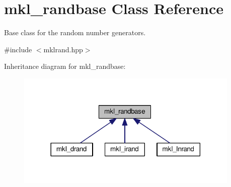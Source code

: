 \hypertarget{classmkl__randbase}{}\section{mkl\+\_\+randbase Class Reference}
\label{classmkl__randbase}


Base class for the random number generators.  




{\ttfamily \#include $<$mklrand.\+hpp$>$}



Inheritance diagram for mkl\+\_\+randbase\+:
\nopagebreak
\begin{figure}[H]
\begin{center}
\leavevmode
\includegraphics[width=302pt]{d4/dab/classmkl__randbase__inherit__graph}
\end{center}
\end{figure}
